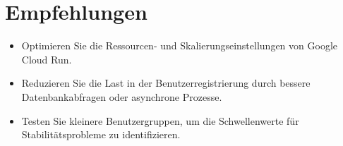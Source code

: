 \section*{Empfehlungen}
\begin{itemize}
    \item Optimieren Sie die Ressourcen- und Skalierungseinstellungen von Google Cloud Run.
    \item Reduzieren Sie die Last in der Benutzerregistrierung durch bessere Datenbankabfragen oder asynchrone Prozesse.
    \item Testen Sie kleinere Benutzergruppen, um die Schwellenwerte für Stabilitätsprobleme zu identifizieren.
\end{itemize}
